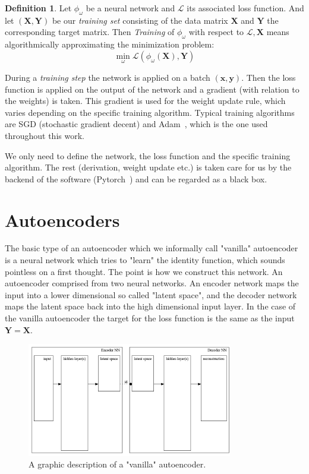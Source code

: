 \documentclass[11pt, a4paper]{report}
\theoremstyle{plain}
\theoremstyle{definition}
\newtheorem{mydef}{Definition}[chapter]
\theoremstyle{remark}
\newcommand{\X}{\mathbf{X}}
\newcommand{\x}{\mathbf{x}}
\newcommand{\Y}{\mathbf{Y}}
\newcommand{\y}{\mathbf{y}}
\begin{document}
\begin{mydef}
Let $\phi_{\omega}$ be a neural network and $\mathcal{L}$ its associated loss
function. And let $(\X, \Y)$ be our \emph{training set} consisting of 
the data matrix $\X$ and $\Y$
the corresponding target matrix.
Then \emph{Training} of $\phi_{\omega}$ with respect to $\mathcal{L}, \X$ 
means
algorithmically approximating the minimization problem:
\begin{equation}
\label{def:training}
\min_{\omega} \mathcal{L}(\phi_{\omega}(\X), \Y)
\end{equation}
\end{mydef}

During a \emph{training step} the network is applied on a batch $(\x,\y)$. Then the
loss function is applied on the output of the network and a gradient (with relation to the
weights) is taken. This gradient is used for the weight update rule, which
varies depending on the specific training algorithm. Typical training algorithms
are SGD (stochastic gradient decent) and Adam~\cite{jais2019adam},
which is the one used throughout
this work.

We only need to define the network, the loss function and the specific training
algorithm. The rest (derivation, weight update etc.) is taken care for us by the
backend of the software (Pytorch~\cite{pytorch2018pytorch}) and can be regarded
as a black box.

\section{Autoencoders}

The basic type of an autoencoder which we informally call "vanilla" autoencoder
is a neural network which tries to "learn" the identity function, which sounds
pointless on a first thought. The point is how we construct this network. An
autoencoder comprised from two neural networks.
An encoder network maps the input into a lower dimensional so called "latent
space", and the decoder network maps the latent space back into the high
dimensional input layer.
In the case of the vanilla autoencoder the target for the loss function is the
same as the input $\Y = \X$.

\begin{figure}[!h]
\begin{framed}
\centering
\includegraphics[width=0.8\textwidth]{./images/models/autoencoderNN.gv.png}
\caption{
A graphic description of a "vanilla" autoencoder.
}
\label{fig:autoencoder}
\end{framed}
\end{figure}
\end{document}
